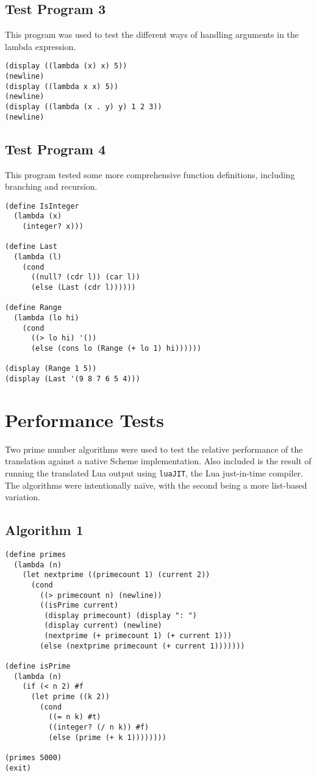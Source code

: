 \subsection{Test Program 3}
This program was used to test the different ways of handling arguments in the
lambda expression.
\begin{framed}
\begin{verbatim}
(display ((lambda (x) x) 5))
(newline)
(display ((lambda x x) 5))
(newline)
(display ((lambda (x . y) y) 1 2 3))
(newline)
\end{verbatim}
\end{framed}

\subsection{Test Program 4}
This program tested some more comprehensive function definitions, including
branching and recursion.
\begin{framed}
\begin{verbatim}
(define IsInteger
  (lambda (x)
    (integer? x)))

(define Last
  (lambda (l)
    (cond
      ((null? (cdr l)) (car l))
      (else (Last (cdr l))))))

(define Range
  (lambda (lo hi)
    (cond
      ((> lo hi) '())
      (else (cons lo (Range (+ lo 1) hi))))))

(display (Range 1 5))
(display (Last '(9 8 7 6 5 4)))
\end{verbatim}
\end{framed}


\section{Performance Tests}

Two prime number algorithms were used to test the relative performance of the
translation against a native Scheme implementation. Also included is the result
of running the translated Lua output using \texttt{luaJIT}, the Lua just-in-time
compiler. The algorithms were intentionally na\"{i}ve, with the second being
a more list-based variation.

\subsection{Algorithm 1}

\begin{framed}
\begin{verbatim}
(define primes
  (lambda (n)
    (let nextprime ((primecount 1) (current 2))
      (cond
        ((> primecount n) (newline))
        ((isPrime current)
         (display primecount) (display ": ")
         (display current) (newline)
         (nextprime (+ primecount 1) (+ current 1)))
        (else (nextprime primecount (+ current 1)))))))

(define isPrime
  (lambda (n)
    (if (< n 2) #f
      (let prime ((k 2))
        (cond
          ((= n k) #t)
          ((integer? (/ n k)) #f)
          (else (prime (+ k 1))))))))

(primes 5000)
(exit)
\end{verbatim}
\end{framed}

